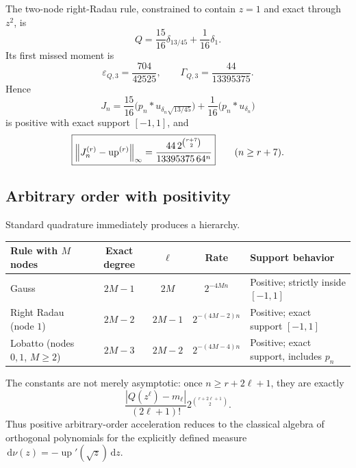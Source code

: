 \documentclass[11pt,oneside]{article}
\numberwithin{equation}{section}
\theoremstyle{definition}
\theoremstyle{remark}
\newcommand{\Up}{\operatorname{up}}
\newcommand{\dd}{\,\mathrm d}
\begin{document}
\begin{example}
\label{p3:ex:radau-two}
The two-node right-Radau rule, constrained to contain $z=1$ and exact through $z^2$,
is
\begin{equation}
 Q=\frac{15}{16}\delta_{13/45}+\frac1{16}\delta_1.
 \label{p3:eq:radau-Q}
\end{equation}
Its first missed moment is
\begin{equation}
 \varepsilon_{Q,3}=\frac{704}{42525},
 \qquad
 \Gamma_{Q,3}=\frac{44}{13395375}.
 \label{p3:eq:radau-gamma}
\end{equation}
Hence
\begin{equation}
 J_n=\frac{15}{16}\bigl(p_n*u_{\delta_n\sqrt{13/45}}\bigr)
 +\frac1{16}\bigl(p_n*u_{\delta_n}\bigr)
 \label{p3:eq:Jn}
\end{equation}
is positive with exact support $[-1,1]$, and
\begin{equation}
 \boxed{
 \norm{J_n^{(r)}-\Up^{(r)}}_\infty
 =\frac{44\,2^{\binom{r+7}{2}}}{13395375\,64^n}}
 \qquad(n\ge r+7).
 \label{p3:eq:Radau-two-law}
\end{equation}
\end{example}

\subsection{Arbitrary order with positivity}

Standard quadrature immediately produces a hierarchy.

\begin{center}
\begin{tabularx}{0.96\textwidth}{@{}lcccX@{}}
\toprule
Rule with $M$ nodes & Exact degree & $\ell$ & Rate & Support behavior\\
\midrule
Gauss & $2M-1$ & $2M$ & $2^{-4Mn}$ & Positive; strictly inside $[-1,1]$\\
Right Radau (node $1$) & $2M-2$ & $2M-1$ & $2^{-(4M-2)n}$ & Positive; exact support $[-1,1]$\\
Lobatto (nodes $0,1$, $M\ge2$) & $2M-3$ & $2M-2$ & $2^{-(4M-4)n}$ & Positive; exact support, includes $p_n$\\
\bottomrule
\end{tabularx}
\end{center}

The constants are not merely asymptotic: once $n\ge r+2\ell+1$, they are exactly
\begin{equation}
 \frac{|Q(z^\ell)-m_\ell|}{(2\ell+1)!}
 2^{\binom{r+2\ell+1}{2}}.
 \label{p3:eq:general-quadrature-constant}
\end{equation}
Thus positive arbitrary-order acceleration reduces to the classical algebra of
orthogonal polynomials for the explicitly defined measure
$\dd\nu(z)=-\Up'(\sqrt z)\dd z$.
\end{document}
